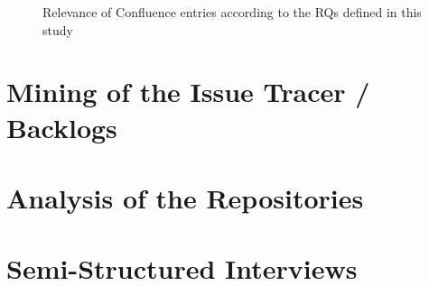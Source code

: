 \begin{figure}[ht]
\begin{minipage}[t]{0.45\linewidth}
        \caption{Relevance of Confluence entries according to the RQs defined in this study}
        \label{fig:confluence_relevance}
    \end{minipage}
\end{figure}




\section{Mining of the Issue Tracer / Backlogs}


\section{Analysis of the Repositories}

\section{Semi-Structured Interviews}